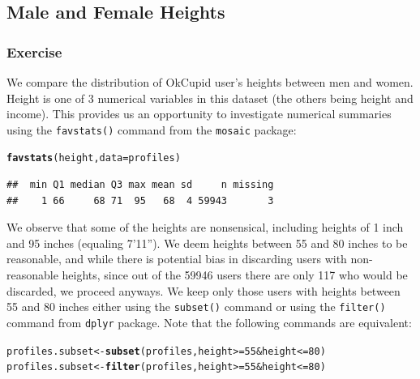 \documentclass{article}\usepackage[]{graphicx}\usepackage[]{color}
\makeatletter
\newcommand{\hlnum}[1]{\textcolor[rgb]{0.686,0.059,0.569}{#1}}%
\newcommand{\hlopt}[1]{\textcolor[rgb]{0,0,0}{#1}}%
\newcommand{\hlstd}[1]{\textcolor[rgb]{0.345,0.345,0.345}{#1}}%
\newcommand{\hlkwb}[1]{\textcolor[rgb]{0.69,0.353,0.396}{#1}}%
\newcommand{\hlkwc}[1]{\textcolor[rgb]{0.333,0.667,0.333}{#1}}%
\newcommand{\hlkwd}[1]{\textcolor[rgb]{0.737,0.353,0.396}{\textbf{#1}}}%
\newenvironment{kframe}{%
 \def\at@end@of@kframe{}%
 \ifinner\ifhmode%
  \def\at@end@of@kframe{\end{minipage}}%
  \begin{minipage}{\columnwidth}%
 \fi\fi%
 \def\FrameCommand##1{\hskip\@totalleftmargin \hskip-\fboxsep
 \colorbox{shadecolor}{##1}\hskip-\fboxsep
     \hskip-\linewidth \hskip-\@totalleftmargin \hskip\columnwidth}%
 \MakeFramed {\advance\hsize-\width
   \@totalleftmargin\z@ \linewidth\hsize
   \@setminipage}}%
 {\par\unskip\endMakeFramed%
 \at@end@of@kframe}
\newenvironment{knitrout}{}{} %
\makeatother
\begin{document}
\subsection{Male and Female Heights}\label{section_height}
\subsubsection{Exercise}
We compare the distribution of OkCupid user's heights between men and women.  Height is one of 3 numerical variables in this dataset (the others being height and income).  This provides us an opportunity to investigate numerical summaries using the \verb#favstats()# command from the \verb#mosaic# package:

\begin{center}
\begin{knitrout}
\color{fgcolor}\begin{kframe}
\begin{alltt}
\hlkwd{favstats}\hlstd{(height,} \hlkwc{data}\hlstd{=profiles)}
\end{alltt}
\begin{verbatim}
##  min Q1 median Q3 max mean sd     n missing
##    1 66     68 71  95   68  4 59943       3
\end{verbatim}
\end{kframe}
\end{knitrout}
\end{center}

We observe that some of the heights are nonsensical, including heights of 1 inch and 95 inches (equaling 7'11'').  We deem heights between 55 and 80 inches to be reasonable, and while there is potential bias in discarding users with non-reasonable heights, since out of the 59946 users there are only 117 who would be discarded, we proceed anyways.  We keep only those users with heights between 55 and 80 inches either using the \verb#subset()# command or using the \verb#filter()# command from \verb#dplyr# package. Note that the following commands are equivalent:

\begin{knitrout}
\color{fgcolor}\begin{kframe}
\begin{alltt}
\hlstd{profiles.subset} \hlkwb{<-} \hlkwd{subset}\hlstd{(profiles, height}\hlopt{>=}\hlnum{55} \hlopt{&} \hlstd{height} \hlopt{<=}\hlnum{80}\hlstd{)}
\hlstd{profiles.subset} \hlkwb{<-} \hlkwd{filter}\hlstd{(profiles, height}\hlopt{>=}\hlnum{55} \hlopt{&} \hlstd{height} \hlopt{<=}\hlnum{80}\hlstd{)}
\end{alltt}
\end{kframe}
\end{knitrout}
\end{document}

